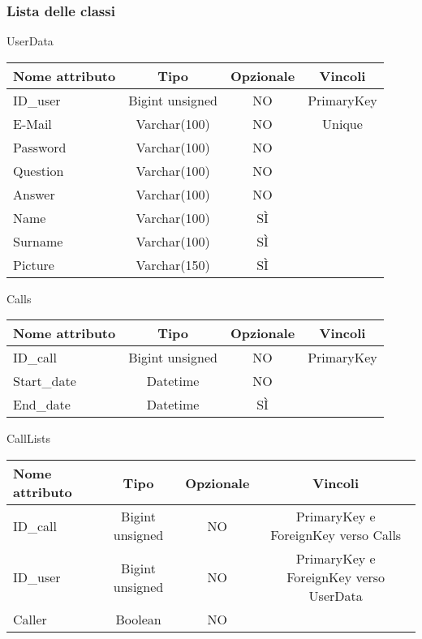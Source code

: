 \subsubsection{Lista delle classi}

\begin{center}

UserData

\begin{center}
\begin{tabular}{lccc}
\toprule
Nome attributo & Tipo & Opzionale & Vincoli\\
\midrule
ID\_user & Bigint unsigned & NO & PrimaryKey\\
E-Mail & Varchar(100) & NO & Unique\\
Password & Varchar(100) & NO &\\
Question & Varchar(100) & NO &\\
Answer & Varchar(100) & NO &\\
Name & Varchar(100) & SÌ &\\
Surname & Varchar(100) & SÌ &\\
Picture & Varchar(150) & SÌ &\\
\bottomrule
\end{tabular}
\end{center}

Calls

\begin{center}
\begin{tabular}{lccc}
\toprule
Nome attributo & Tipo & Opzionale & Vincoli\\
\midrule
ID\_call & Bigint unsigned & NO & PrimaryKey\\
Start\_date & Datetime & NO & \\
End\_date & Datetime & SÌ &\\
\bottomrule
\end{tabular}
\end{center}

CallLists

\begin{center}
\begin{tabular}{lccc}
\toprule
Nome attributo & Tipo & Opzionale & Vincoli\\
\midrule
ID\_call & Bigint unsigned & NO & PrimaryKey e ForeignKey verso Calls\\
ID\_user & Bigint unsigned & NO & PrimaryKey e ForeignKey verso UserData \\
Caller & Boolean & NO &\\
\bottomrule
\end{tabular}
\end{center}


\end{center}
